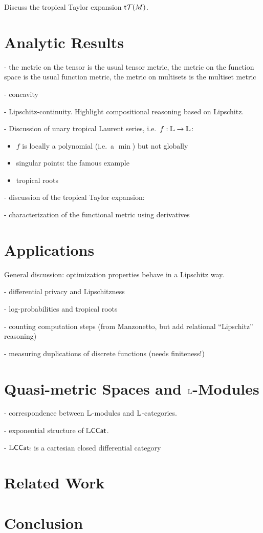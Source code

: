 \documentclass[conference]{IEEEtran}
\begin{document}
Discuss the tropical Taylor expansion $\mathsf{t} \mathcal{T}(M)$. 





\section{Analytic Results}



- the metric on the tensor is the usual tensor metric, the metric on the function space is the usual function metric, the metric on multisets is the multiset metric

- concavity

- Lipschitz-continuity. Highlight compositional reasoning based on Lipschitz.

- Discussion of unary tropical Laurent series, i.e.~$f:\mathbb{L} \to \mathbb{L}$:
\begin{itemize}

\item $f$ is locally a polynomial (i.e.~a $\min$) but not globally

\item singular points: the famous example

\item tropical roots


\end{itemize}



- discussion of the tropical Taylor expansion: 


- characterization of the functional metric using derivatives



\section{Applications}

General discussion: optimization properties behave in a Lipschitz way.


- differential privacy and Lipschitzness


- log-probabilities and tropical roots 


- counting computation steps (from Manzonetto, but add relational ``Lipschitz'' reasoning)


- measuring duplications of discrete functions (needs finiteness!)






\section{Quasi-metric Spaces and $\mathbb{L}$-Modules}


- correspondence between $\mathbb{L}$-modules and $\mathbb{L}$-categories.


- exponential structure of $\mathbb{L}\mathsf{CCat}$.


- $\mathbb{L}\mathsf{CCat}_{!}$ is a cartesian closed differential category


\section{Related Work}


\section{Conclusion}
\end{document}
